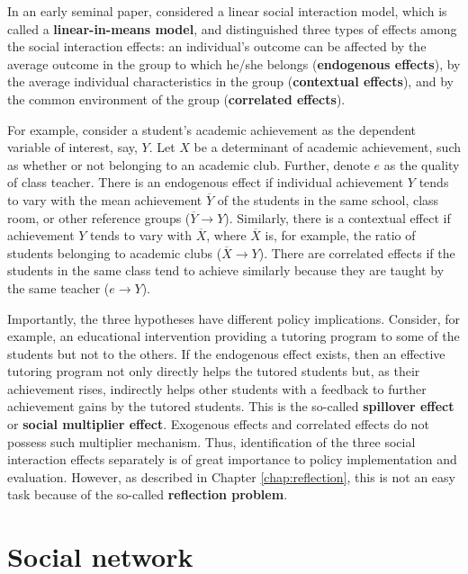 \documentclass[10.5pt, A4paper, openany, uplatex]{book}
\renewcommand{\bar}{\overline}
\numberwithin{equation}{section}
\begin{document}
In an early seminal paper, \cite{manski1993identification} considered a linear social interaction model, which is called a \textbf{linear-in-means model}, and distinguished three types of effects among the social interaction effects: an individual's outcome can be affected by the average outcome in the group to which he/she belongs (\textbf{endogenous effects}), by the average individual characteristics in the group (\textbf{contextual effects}), and by the common environment of the group (\textbf{correlated effects}).

For example, consider a student's academic achievement as the dependent variable of interest, say, $Y$.
Let $X$ be a determinant of academic achievement, such as whether or not belonging to an academic club.
Further, denote $e$ as the quality of class teacher.
There is an endogenous effect if individual achievement $Y$ tends to vary with the mean achievement $\bar{Y}$ of the students in the same school, class room, or other reference groups ($\bar{Y} \to Y$).
Similarly, there is a contextual effect if achievement $Y$ tends to vary with $\bar{X}$, where $\bar{X}$ is, for example, the ratio of students belonging to academic clubs ($\bar{X} \to Y$).
There are correlated effects if the students in the same class tend to achieve similarly because they are taught by the same teacher ($e \to Y$).

Importantly, the three hypotheses have different policy implications.
Consider, for example, an educational intervention providing a tutoring program to some of the students but not to the others.
If the endogenous effect exists, then an effective tutoring program not only directly helps the tutored students but, as their achievement rises, indirectly helps  other students with a feedback to further achievement gains by the tutored students.
This is the so-called \textbf{spillover effect} or \textbf{social multiplier effect}.
Exogenous effects and correlated effects do not possess such multiplier mechanism.
Thus, identification of the three social interaction effects separately is of great importance to policy implementation and evaluation.
However, as described in Chapter \ref{chap:reflection}, this is not an easy task because of the so-called \textbf{reflection problem}.

\section{Social network}
\end{document}
